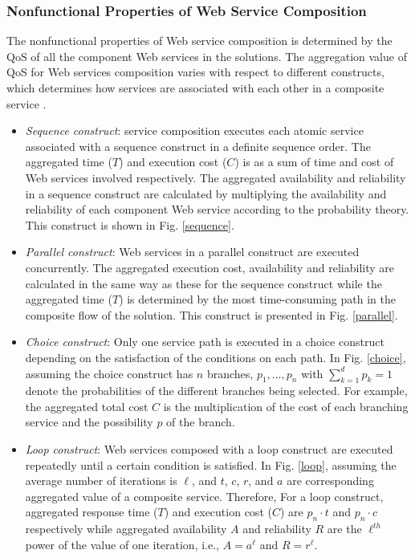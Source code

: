 \subsubsection{Nonfunctional Properties of Web Service Composition}
The nonfunctional properties of Web service composition is determined by the QoS of all the component Web services in the solutions. The aggregation value of QoS for Web services composition varies with respect to different constructs, which determines how services are associated with each other in a composite service \cite{zeng2003quality}.
\begin{itemize}

\item \emph{Sequence construct}: service composition executes each atomic service associated with a sequence construct in a definite sequence order. The aggregated time ($T$) and execution cost ($C$) is as a sum of time and cost of Web services involved respectively. The aggregated availability and reliability in a sequence construct are calculated by multiplying the availability and reliability of each component Web service according to the probability theory. This construct is shown in Fig. \ref{sequence}.
\item \emph{Parallel construct}: Web services in a parallel construct are executed concurrently. The aggregated execution cost, availability and reliability are calculated in the same way as these for the sequence construct while the aggregated time ($T$) is determined by the most time-consuming path in the composite flow of the solution. This construct is presented in Fig. \ref{parallel}.
\item \emph{Choice construct}: Only one service path is executed in a choice construct depending on the satisfaction of the conditions on each path. In Fig. \ref{choice}, assuming the choice construct has $n$ branches, $p_1,\ldots, p_n$ with  $\sum\limits^d_{k=1}p_k=1$ denote the probabilities of the different branches being selected. For example, the aggregated total cost $C$  is the multiplication of the cost of each branching service and the possibility $p$ of the branch.
\item \emph{Loop construct}: Web services composed with a loop construct are executed repeatedly until a certain condition is satisfied. In Fig. \ref{loop}, assuming the average number of iterations is $\ell$, and $t$, $c$, $r$, and $a$ are corresponding aggregated value of a composite service. Therefore, For a loop construct, aggregated response time ($T$) and execution cost ($C$) are $p_n \cdot t$ and $p_n \cdot c$ respectively while aggregated availability $A$ and reliability $R$ are the $\ell^{th}$ power of the value of one iteration, i.e., $A=a^\ell$ and $R=r^\ell$.
\end{itemize}


